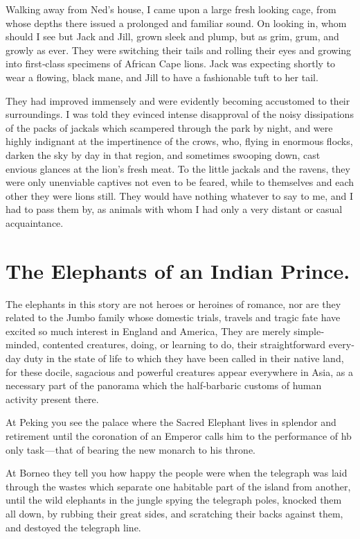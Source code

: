 \documentclass[12pt]{book}
\begin{document}
Walking away from Ned’s house, I came upon a large fresh looking cage, from
whose depths there issued a prolonged and familiar sound. On looking in, whom
should I see but Jack and Jill, grown sleek and plump, but as grim, grum, and
growly as ever. They were switching their tails and rolling their eyes and growing
into first‐class specimens of African Cape lions. Jack was expecting shortly to
wear a flowing, black mane, and Jill to have a fashionable tuft to her tail.

They had improved immensely and were evidently becoming accustomed
to their surroundings. I was told they evinced intense disapproval of the noisy
dissipations of the packs of jackals which scampered through the park by night,
and were highly indignant at the impertinence of the crows, who, flying in
enormous flocks, darken the sky by day in that region, and sometimes swooping
down, cast envious glances at the lion’s fresh meat. To the little jackals and
the ravens, they were only unenviable captives not even to be feared, while
to themselves and each other they were lions still. They would have nothing
whatever to say to me, and I had to pass them by, as animals with whom I had
only a very distant or casual acquaintance.

\chapter{The Elephants of an Indian Prince.}

The elephants in this story are not heroes or heroines of romance, nor are they
related to the Jumbo family whose domestic trials, travels and tragic fate have
excited so much interest in England and America, They are merely simple‐minded,
contented creatures, doing, or learning to do, their straightforward every‐day
duty in the state of life to which they have been called in their native land, for
these docile, sagacious and powerful creatures appear everywhere in Asia, as
a necessary part of the panorama which the half‐barbaric customs of human
activity present there.

At Peking you see the palace where the Sacred Elephant lives in splendor and
retirement until the coronation of an Emperor calls him to the performance of hb
only task — that of bearing the new monarch to his throne.

At Borneo they tell you how happy the people were when the telegraph
was laid through the wastes which separate one habitable part of the island from
another, until the wild elephants in the jungle spying the telegraph poles, knocked
them all down, by rubbing their great sides, and scratching their backs against
them, and destoyed the telegraph line.
\end{document}
